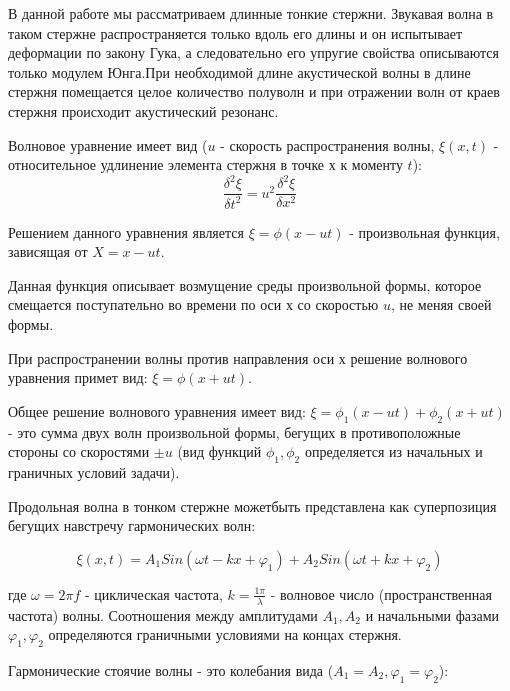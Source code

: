     В данной работе мы рассматриваем длинные тонкие стержни. Звукавая волна в таком стержне распространяется только вдоль его длины и он испытывает деформации по закону Гука, а следовательно его упругие свойства описываются только модулем Юнга.При необходимой длине акустической волны в длине стержня помещается целое количество полуволн и при отражении волн от краев стержня происходит акустический резонанс.
    
    
    Волновое уравнение имеет вид ($u$ - скорость распространения волны, $\xi (x, t)$ - относительное удлинение элемента стержня в точке х к моменту $t$):
\begin{equation} \label{волновое уравнение}
    \frac{\delta^2\xi}{\delta t^2} = u^2 \frac{\delta^2\xi}{\delta x^2}
\end{equation}

    Решением данного уравнения является $\xi = \phi(x-ut)$ - произвольная функция, зависящая от $X = x - ut$. 
    
    Данная функция описывает возмущение среды произвольной формы, которое смещается поступательно во времени по оси х со скоростью $u$, не меняя своей формы. 
    
    При распространении волны против направления оси х решение волнового уравнения примет вид: $\xi =\phi(x+ut)$.
    
    Общее решение волнового уравнения имеет вид: $\xi =\phi_1(x-ut) + \phi_2(x+ut)$ - это сумма двух волн произвольной формы, бегущих в противоположные стороны со скоростями $\pm u$ (вид функций $\phi_1,\phi_2$ определяется из начальных и граничных условий задачи).
    
    
    
    
    Продольная волна в тонком стержне можетбыть представлена как суперпозиция бегущих навстречу гармонических волн:
    
\begin{equation}
    \xi (x, t) = A_1 Sin(\omega t - kx + \varphi_1) + A_2 Sin(\omega t + kx + \varphi_2)
\end{equation}

    где $\omega = 2\pi f$ - циклическая частота, $k = \frac{1\pi}{\lambda}$ - волновое число (пространственная частота) волны. Соотношения между амплитудами $A_1, A_2$ и начальными фазами $\varphi_1, \varphi_2$ определяются граничными условиями на концах стержня.
    
    
    
    Гармонические стоячие волны - это колебания вида ($A_1 = A_2, \varphi_1 = \varphi_2$):
    
